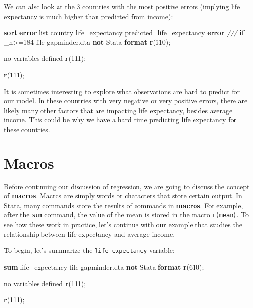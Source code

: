 \documentclass[
]{book}
\newenvironment{Shaded}{\begin{snugshade}}{\end{snugshade}}
\newcommand{\CommentTok}[1]{\textcolor[rgb]{0.56,0.35,0.01}{\textit{#1}}}
\newcommand{\DataTypeTok}[1]{\textcolor[rgb]{0.13,0.29,0.53}{#1}}
\newcommand{\FunctionTok}[1]{\textcolor[rgb]{0.13,0.29,0.53}{\textbf{#1}}}
\newcommand{\KeywordTok}[1]{\textcolor[rgb]{0.13,0.29,0.53}{\textbf{#1}}}
\newcommand{\NormalTok}[1]{#1}
\newcommand{\OtherTok}[1]{\textcolor[rgb]{0.56,0.35,0.01}{#1}}
\begin{document}
We can also look at the 3 countries with the most positive errors (implying life expectancy is much higher than predicted from income):

\begin{Shaded}
\begin{Highlighting}[]
\KeywordTok{sort} \KeywordTok{error}
\OtherTok{list}\NormalTok{ country life\_expectancy predicted\_life\_expectancy }\KeywordTok{error} \CommentTok{///}
\KeywordTok{if} \DataTypeTok{\_n}\NormalTok{\textgreater{}=184}
\NormalTok{file gapminder.dta }\KeywordTok{not}\NormalTok{ Stata }\KeywordTok{format}
\FunctionTok{r}\NormalTok{(610);}


\NormalTok{no variables defined}
\FunctionTok{r}\NormalTok{(111);}

\FunctionTok{r}\NormalTok{(111);}
\end{Highlighting}
\end{Shaded}

It is sometimes interesting to explore what observations are hard to predict for our model. In these countries with very negative or very positive errors, there are likely many other factors that are impacting life expectancy, besides average income. This could be why we have a hard time predicting life expectancy for these countries.

\section{Macros}\label{macros}

Before continuing our discussion of regression, we are going to discuss the concept of \textbf{macros}. Macros are simply words or characters that store certain output. In Stata, many commands store the results of commands in \textbf{macros}. For example, after the \texttt{sum} command, the value of the mean is stored in the macro \texttt{r(mean)}. To see how these work in practice, let's continue with our example that studies the relationship between life expectancy and average income.

To begin, let's summarize the \texttt{life\_expectancy} variable:

\begin{Shaded}
\begin{Highlighting}[]
\KeywordTok{sum}\NormalTok{ life\_expectancy}
\NormalTok{file gapminder.dta }\KeywordTok{not}\NormalTok{ Stata }\KeywordTok{format}
\FunctionTok{r}\NormalTok{(610);}


\NormalTok{no variables defined}
\FunctionTok{r}\NormalTok{(111);}

\FunctionTok{r}\NormalTok{(111);}
\end{Highlighting}
\end{Shaded}
\end{document}
